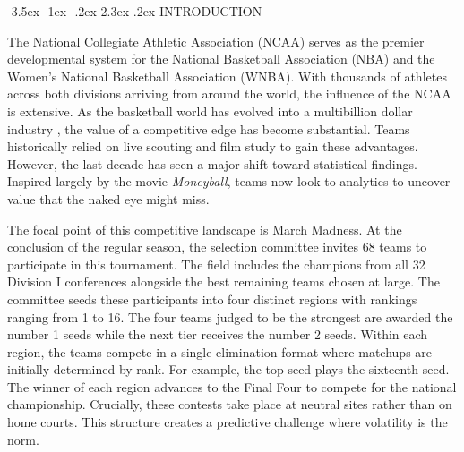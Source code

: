 \documentclass[12pt,leqno]{article}\usepackage[pdftex]{graphicx}\usepackage[usenames,dvipsnames]{xcolor}
\makeatletter
\renewcommand\section{\@startsection {section}{1}{\z@}%
{-3.5ex \@plus -1ex \@minus -.2ex}%
{2.3ex \@plus.2ex}%
{\normalfont\centering}}
\theoremstyle{remark}
\makeatother
\begin{document}
\begin{center}
\listoffigures
\end{center}
\thispagestyle{empty}
\newpage



\doublespacing%

\begin{center}
\section{INTRODUCTION}
\end{center}
\setcounter{page}{1}%
\thispagestyle{empty} %
The National Collegiate Athletic Association (NCAA) serves as the premier developmental system for the National Basketball Association (NBA) and the Women's National Basketball Association (WNBA). With thousands of athletes across both divisions arriving from around the world, the influence of the NCAA is extensive. As the basketball world has evolved into a multibillion dollar industry \cite{Berkowitz2025}, the value of a competitive edge has become substantial. Teams historically relied on live scouting and film study to gain these advantages. However, the last decade has seen a major shift toward statistical findings. Inspired largely by the movie \textit{Moneyball}, teams now look to analytics to uncover value that the naked eye might miss. 

The focal point of this competitive landscape is March Madness. At the conclusion of the regular season, the selection committee invites 68 teams to participate in this tournament. The field includes the champions from all 32 Division I conferences alongside the best remaining teams chosen at large. The committee seeds these participants into four distinct regions with rankings ranging from 1 to 16. The four teams judged to be the strongest are awarded the number 1 seeds while the next tier receives the number 2 seeds. Within each region, the teams compete in a single elimination format where matchups are initially determined by rank. For example, the top seed plays the sixteenth seed. The winner of each region advances to the Final Four to compete for the national championship. Crucially, these contests take place at neutral sites rather than on home courts. This structure creates a predictive challenge where volatility is the norm.
\end{document}
